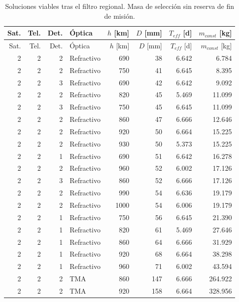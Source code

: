 \begin{longtable}{rrrlrrrr}
\caption{Soluciones viables tras el filtro regional. Masa de selección sin reserva de fin de misión.}\\
\toprule
Sat. & Tel. & Det. & Óptica & $h$ [km] & $D$ [mm] & $T_{eff}$ [d] & $m_{const}$ [kg] \\
\midrule
\endfirsthead
\toprule
Sat. & Tel. & Det. & Óptica & $h$ [km] & $D$ [mm] & $T_{eff}$ [d] & $m_{const}$ [kg] \\
\midrule
\endhead
2 & 2 & 2 & Refractivo & 690 & 38 & 6.642 & 6.784 \\
2 & 2 & 2 & Refractivo & 750 & 41 & 6.645 & 8.395 \\
2 & 2 & 3 & Refractivo & 690 & 42 & 6.642 & 9.092 \\
2 & 2 & 2 & Refractivo & 820 & 45 & 5.469 & 11.099 \\
2 & 2 & 3 & Refractivo & 750 & 45 & 6.645 & 11.099 \\
2 & 2 & 2 & Refractivo & 860 & 47 & 6.666 & 12.646 \\
2 & 2 & 2 & Refractivo & 920 & 50 & 6.664 & 15.225 \\
2 & 2 & 2 & Refractivo & 930 & 50 & 5.373 & 15.225 \\
2 & 2 & 1 & Refractivo & 690 & 51 & 6.642 & 16.278 \\
2 & 2 & 2 & Refractivo & 960 & 52 & 6.002 & 17.126 \\
2 & 2 & 3 & Refractivo & 860 & 52 & 6.666 & 17.126 \\
2 & 2 & 2 & Refractivo & 990 & 54 & 6.636 & 19.179 \\
2 & 2 & 2 & Refractivo & 1000 & 54 & 6.006 & 19.179 \\
2 & 2 & 1 & Refractivo & 750 & 56 & 6.645 & 21.390 \\
2 & 2 & 1 & Refractivo & 820 & 61 & 5.469 & 27.646 \\
2 & 2 & 1 & Refractivo & 860 & 64 & 6.666 & 31.929 \\
2 & 2 & 1 & Refractivo & 920 & 68 & 6.664 & 38.298 \\
2 & 2 & 1 & Refractivo & 960 & 71 & 6.002 & 43.594 \\
2 & 2 & 2 & TMA & 860 & 147 & 6.666 & 264.922 \\
2 & 2 & 2 & TMA & 920 & 158 & 6.664 & 328.956 \\
\bottomrule
\end{longtable}
